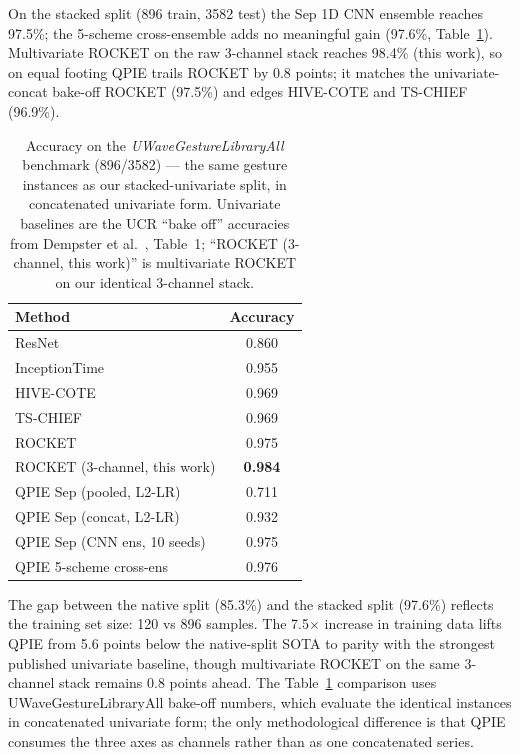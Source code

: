 \documentclass[conference,compsoc]{IEEEtran}
\begin{document}
On the stacked split (896 train, 3582 test) the Sep 1D CNN ensemble
reaches 97.5\%; the 5-scheme cross-ensemble adds no meaningful gain
(97.6\%, Table~\ref{tab:stacked}).
Multivariate ROCKET on the raw 3-channel stack reaches 98.4\%
(this work), so on equal footing QPIE trails ROCKET by 0.8 points; it
matches the univariate-concat bake-off ROCKET (97.5\%) and edges
HIVE-COTE and TS-CHIEF (96.9\%).

\begin{table}[t]
\caption{Accuracy on the \textit{UWaveGestureLibraryAll} benchmark
(896/3582) --- the same gesture instances as our stacked-univariate
split, in concatenated univariate form. Univariate baselines are the
UCR ``bake off'' accuracies from Dempster et al.~\cite{dempster2020rocket},
Table~1; ``ROCKET (3-channel, this work)'' is multivariate ROCKET on
our identical 3-channel stack.}
\label{tab:stacked}
\centering
\begin{tabular}{lc}
\toprule
Method & Accuracy \\
\midrule
ResNet                                   & 0.860 \\
InceptionTime~\cite{fawaz2020inceptiontime} & 0.955 \\
HIVE-COTE~\cite{bagnall2020hivecote}     & 0.969 \\
TS-CHIEF                                 & 0.969 \\
ROCKET~\cite{dempster2020rocket}         & 0.975 \\
\midrule
ROCKET (3-channel, this work)            & \textbf{0.984} \\
QPIE Sep (pooled, L2-LR)                 & 0.711 \\
QPIE Sep (concat, L2-LR)                 & 0.932 \\
QPIE Sep (CNN ens, 10 seeds)             & 0.975 \\
QPIE 5-scheme cross-ens                  & 0.976 \\
\bottomrule
\end{tabular}
\end{table}

The gap between the native split (85.3\%) and the stacked split
(97.6\%) reflects the training set size: 120 vs 896 samples.
The 7.5$\times$ increase in training data lifts QPIE from 5.6 points
below the native-split SOTA to parity with the strongest published
univariate baseline, though multivariate ROCKET on the same 3-channel
stack remains 0.8 points ahead.
The Table~\ref{tab:stacked} comparison uses UWaveGestureLibraryAll
bake-off numbers, which evaluate the identical instances in
concatenated univariate form; the only methodological difference is
that QPIE consumes the three axes as channels rather than as one
concatenated series.
\end{document}
